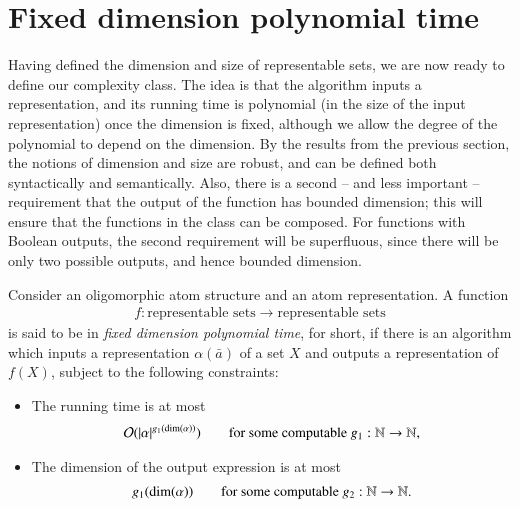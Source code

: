 \section{Fixed dimension polynomial time}
\label{sec:syntactic-poly} 
Having defined the dimension and size of representable sets, we are now ready to define  our complexity class.  The idea is that the algorithm inputs a representation, and its running time  is polynomial (in the size of the input representation) once the dimension is fixed, although we allow the degree of the polynomial to depend on the dimension. By the results from the previous section, the notions of dimension and size are robust, and can be defined both syntactically and semantically.   Also, there is a second -- and less important  -- requirement that the output of the function has bounded dimension; this will ensure that the functions in the class can be composed. For functions with Boolean outputs, the second requirement will be superfluous, since there will be only two possible outputs, and hence bounded dimension.


\begin{definition}\label{def:syntactic-fdp}
    Consider an oligomorphic atom structure and an atom representation. 
    A function 
    \begin{align*}
    f : \text{representable sets} \to \text{representable sets}
    \end{align*}
    is said to be in \emph{fixed dimension polynomial time},  \fdp for short, if there is an algorithm which inputs a representation $\alpha(\bar a)$ of a set $X$ and outputs a representation of $f(X)$, subject to the following constraints:
    \begin{itemize}
        \item The running time is at most 
         \begin{align*}
 {\mathcal O}(|\alpha|^{g_1(\mathrm{dim}(\alpha))})\qquad \text{for some computable $g_1 : {\mathbb N} \to {\mathbb N}$},
\end{align*}
\item The dimension of the output expression is at most 
\begin{align*}
 g_1(\mathrm{dim}(\alpha)) \qquad \text{for some computable $g_2 : {\mathbb N} \to {\mathbb N}$.}
\end{align*}
    \end{itemize}
\end{definition}

